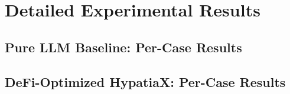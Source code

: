 \documentclass[twoside,11pt]{article}
\begin{document}


\section{Detailed Experimental Results}
\label{app:detailed_results}

\subsection{Pure LLM Baseline: Per-Case Results}



\subsection{DeFi-Optimized HypatiaX: Per-Case Results}


\end{document}
